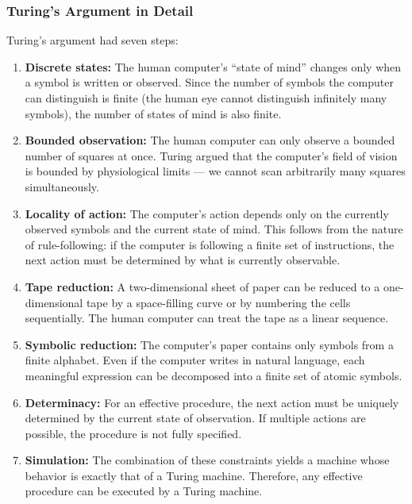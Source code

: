 \subsubsection*{Turing's Argument in Detail}

Turing's argument had seven steps:

\begin{enumerate}
\item \textbf{Discrete states:} The human computer's ``state of mind'' changes only when a symbol is written or observed. Since the number of symbols the computer can distinguish is finite (the human eye cannot distinguish infinitely many symbols), the number of states of mind is also finite.

\item \textbf{Bounded observation:} The human computer can only observe a bounded number of squares at once. Turing argued that the computer's field of vision is bounded by physiological limits --- we cannot scan arbitrarily many squares simultaneously.

\item \textbf{Locality of action:} The computer's action depends only on the currently observed symbols and the current state of mind. This follows from the nature of rule-following: if the computer is following a finite set of instructions, the next action must be determined by what is currently observable.

\item \textbf{Tape reduction:} A two-dimensional sheet of paper can be reduced to a one-dimensional tape by a space-filling curve or by numbering the cells sequentially. The human computer can treat the tape as a linear sequence.

\item \textbf{Symbolic reduction:} The computer's paper contains only symbols from a finite alphabet. Even if the computer writes in natural language, each meaningful expression can be decomposed into a finite set of atomic symbols.

\item \textbf{Determinacy:} For an effective procedure, the next action must be uniquely determined by the current state of observation. If multiple actions are possible, the procedure is not fully specified.

\item \textbf{Simulation:} The combination of these constraints yields a machine whose behavior is exactly that of a Turing machine. Therefore, any effective procedure can be executed by a Turing machine.
\end{enumerate}

